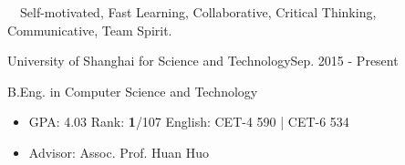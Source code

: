 \documentclass{sorahjy_cv}
\begin{document}
\pagestyle{empty}


\begin{cvHeader}
\end{cvHeader}

%
%

\begin{description}{}
	\item{\ \ }Self-motivated, Fast Learning, Collaborative, Critical Thinking, Communicative, Team Spirit.
\end{description}



%
%

\begin{sectionContentSimple}{University of Shanghai for Science and Technology}{Sep. 2015 - Present}
	\item B.Eng. in Computer Science and Technology
	\begin{itemize}
		\item GPA: 4.03 \quad Rank: \textbf{1}/107 \quad \quad English: CET-4 590 | CET-6 534
		\item Advisor: Assoc. Prof. Huan Huo
	\end{itemize}
	
\end{sectionContentSimple}

%
%




\end{document}
